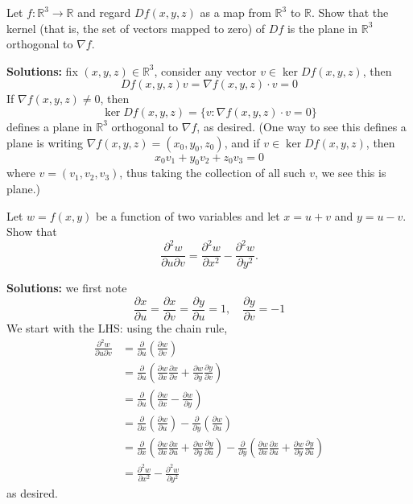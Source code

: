 \documentclass[openany]{book}
\newcommand{\R}{\mathbb{R}}
\begin{document}
\begin{prob}
Let \( f : \mathbb{R}^{3} \to \mathbb{R} \) and regard \( Df(x, y, z) \) as a map from \( \mathbb{R}^{3} \) to \( \mathbb{R} \). Show that the kernel (that is, the set of vectors mapped to zero) of \( Df \) is the plane in \( \mathbb{R}^{3} \) orthogonal to \( \nabla f \).
\end{prob}
\textbf{Solutions:} fix $(x,y,z)\in\R^3$, consider any vector $v\in\ker Df(x,y,z)$, then
\begin{equation*}
    Df(x,y,z)v=\nabla f(x,y,z)\cdot v=0
\end{equation*}
If $\nabla f(x,y,z)\neq 0$, then 
\begin{equation*}
    \ker Df(x,y,z)=\{v:\nabla f(x,y,z)\cdot v=0\} 
\end{equation*}
defines a plane in $\R^3$ orthogonal to $\nabla f$, as desired. (One way to see this defines a plane is writing $\nabla f(x,y,z)=(x_0, y_0, z_0)$, and if $v\in\ker Df(x,y,z)$, then
\begin{equation*}
    x_0v_1+y_0v_2+z_0v_3=0
\end{equation*}
where $v=(v_1,v_2,v_3)$, thus taking the collection of all such $v$, we see this is plane.)







\begin{prob}
Let \( w = f(x, y) \) be a function of two variables and let \( x = u + v \) and \( y = u - v \). Show that  
\[ \frac{\partial^{2} w}{\partial u \partial v} = \frac{\partial^{2} w}{\partial x^{2}} - \frac{\partial^{2} w}{\partial y^{2}}. \]
\end{prob}
\textbf{Solutions:} we first note 
\begin{equation*}
    \frac{\partial x}{\partial u}=\frac{\partial x}{\partial v}=\frac{\partial y}{\partial u}=1, \quad \frac{\partial y}{\partial v}=-1
\end{equation*}
We start with the LHS: using the chain rule,
\begin{align*}
    \frac{\partial^2w}{\partial u\partial v}&=\frac{\partial}{\partial u}\left(\frac{\partial w}{\partial v}\right)\\
    &=\frac{\partial}{\partial u}\left(\frac{\partial w}{\partial x}\frac{\partial x}{\partial v}+\frac{\partial w}{\partial y}\frac{\partial y}{\partial v}\right)\\
    &=\frac{\partial}{\partial u}\left(\frac{\partial w}{\partial x}-\frac{\partial w}{\partial y}\right)\\
    &=\frac{\partial}{\partial x}\left(\frac{\partial w}{\partial u}\right)-\frac{\partial }{\partial y}\left(\frac{\partial w}{\partial u}\right)\\
    &=\frac{\partial}{\partial x}\left(\frac{\partial w}{\partial x}\frac{\partial x}{\partial u}+\frac{\partial w}{\partial y}\frac{\partial y}{\partial u}\right)-\frac{\partial}{\partial y}\left(\frac{\partial w}{\partial x}\frac{\partial x}{\partial u}+\frac{\partial w}{\partial y}\frac{\partial y}{\partial u}\right)\\
    &=\frac{\partial^2w}{\partial x^2}-\frac{\partial^2w}{\partial y^2}
\end{align*}
as desired.
\end{document}
